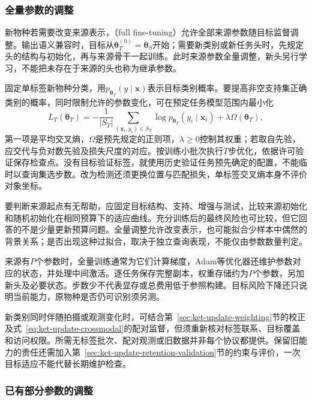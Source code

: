 \subsubsection{全量参数的调整}
\label{sec:ket-transfer-full-finetuning}

新物种若需要改变来源表示，（full fine-tuning）允许全部来源参数随目标监督调整。输出语义兼容时，目标从$\bm\theta_T^{(0)}=\bm\theta_S$开始；需要新类别或新任务头时，先规定头的结构与初始化，再与来源骨干一起训练。此时来源参数全量调整，新头另行学习，不能把未存在于来源的头也称为继承参数。

固定单标签新物种分类，用$p_{\bm\theta_T}(y\mid\bm x)$表示目标类别概率。要提高非空支持集正确类别的概率，同时限制允许的参数变化，可在预定任务模型范围内最小化
\begin{equation}
  L_T(\bm{\theta}_T)
   =-\frac1{|S_T|}\sum_{(\bm x_i,y_i)\in S_T}
       \log p_{\bm{\theta}_T}(y_i\mid\bm x_i)
       +\lambda\Omega(\bm{\theta}_T),
  \label{eq:ket-transfer-finetuning-loss}
\end{equation}
第一项是平均交叉熵，$\Omega$是预先规定的正则项，$\lambda\ge0$控制其权重；若取自先验，应交代与负对数先验及损失尺度的对应。按训练小批次执行$T$步优化，依据许可验证保存检查点。没有目标验证标签，就使用历史验证任务预先确定的配置，不能临时以查询集选步数。改为检测还须更换位置与匹配损失，单标签交叉熵本身不评价对象坐标。

要判断来源起点有无帮助，应固定目标结构、支持、增强与测试，比较来源初始化和随机初始化在相同预算下的适应曲线。充分训练后的最终风险也可比较，但它回答的不是少量更新预算问题。全量调整允许改变表示，也可能拟合少样本中偶然的背景关系；是否出现这种过拟合，取决于独立查询表现，不能仅由参数数量判定。

来源有$P$个参数时，全量训练通常为它们计算梯度，Adam等优化器还维护参数对应的状态，并处理中间激活。逐任务保存完整副本，权重存储约为$P$个参数，另加新头及必要状态。步数少不代表显存或总费用低于参照构建。目标风险下降还只说明当前能力，原物种是否仍可识别须另测。

新类别同时伴随拍摄或观测变化时，可结合第~\ref{sec:ket-update-weighting}节的校正及式~\eqref{eq:ket-update-crossmodal}的配对监督，但须重新核对标签联系、目标覆盖和访问权限。所需无标签批次、配对观测或旧数据并非每个协议都提供。保留旧能力的责任还需加入第~\ref{sec:ket-update-retention-validation}节的约束与评价，一次目标适应不能代替长期维护检查。

\subsubsection{已有部分参数的调整}
\label{sec:ket-transfer-existing-parameters}


